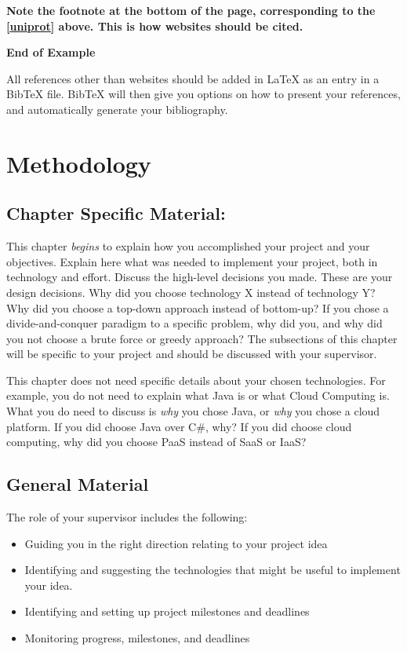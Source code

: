 \documentclass{report}[a4paper,12pt,onecolumn]
\begin{document}
\textbf{Note the footnote at the bottom of the page, corresponding to the \ref{uniprot} above. This is how websites should be cited.}

\textbf{End of Example}

All references other than websites should be added in LaTeX as an entry in a BibTeX file. BibTeX will then give you options on how to present your references, and automatically generate your bibliography.

\chapter{Methodology}

\section{Chapter Specific Material:}

This chapter \textit{begins} to explain how you accomplished your project and your objectives. Explain here what was needed to implement your project, both in technology and effort. Discuss the high-level decisions you made. These are your design decisions. Why did you choose technology X instead of technology Y? Why did you choose a top-down approach instead of bottom-up? If you chose a divide-and-conquer paradigm to a specific problem, why did you, and why did you not choose a brute force or greedy approach? The subsections of this chapter will be specific to your project and should be discussed with your supervisor.

This chapter does not need specific details about your chosen technologies. For example, you do not need to explain what Java is or what Cloud Computing is. What you do need to discuss is \textit{why} you chose Java, or \textit{why} you chose a cloud platform. If you did choose Java over C\#, why? If you did choose cloud computing, why did you choose PaaS instead of SaaS or IaaS?

\section{General Material}

The role of your supervisor includes the following:
\begin{itemize}
    \item Guiding you in the right direction relating to your project idea
    \item Identifying and suggesting the technologies that might be useful to 
implement your idea.
    \item Identifying and setting up project milestones and deadlines
    \item Monitoring progress, milestones, and deadlines
\end{itemize}
\end{document}
